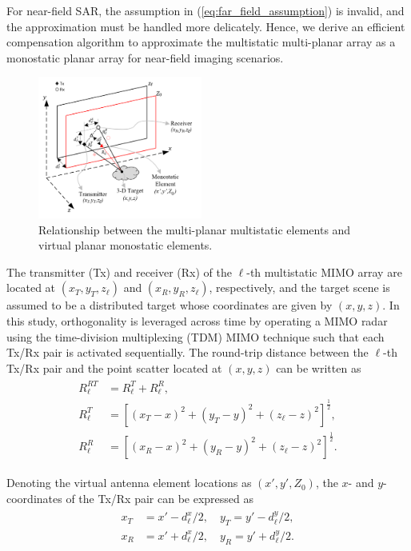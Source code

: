 \documentclass{ieeeaccess}
\begin{document}
For near-field SAR, the assumption in (\ref{eq:far_field_assumption}) is invalid, and the approximation must be handled more delicately. 
Hence, we derive an efficient compensation algorithm to approximate the multistatic multi-planar array as a monostatic planar array for near-field imaging scenarios.

\begin{figure}[h]
    \centering
    \includegraphics[width=0.48\textwidth]{smith2.png}
    \caption{Relationship between the multi-planar multistatic elements and virtual planar monostatic elements.}
    \label{fig:virtual_array_compensation}
\end{figure}

The transmitter (Tx) and receiver (Rx) of the $\ell$-th multistatic MIMO array are located at $(x_T,y_T,z_\ell)$ and $(x_R,y_R,z_\ell)$, respectively, and the target scene is assumed to be a distributed target whose coordinates are given by $(x,y,z)$. 
In this study, orthogonality is leveraged across time by operating a MIMO radar using the time-division multiplexing (TDM) MIMO technique such that each Tx/Rx pair is activated sequentially. 
The round-trip distance between the $\ell$-th Tx/Rx pair and the point scatter located at $(x,y,z)$ can be written as 
\begin{align}
\label{eq:Rl_of_xT_xR_yT_yR}
    \begin{split}
        R_\ell^{RT}&= R_\ell^T + R_\ell^R, \\
        R_\ell^T &= \left[(x_T - x)^2 + (y_T - y)^2 + (z_\ell - z)^2 \right]^{\frac{1}{2}}, \\
        R_\ell^R &= \left[(x_R - x)^2 + (y_R - y)^2 + (z_\ell - z)^2 \right]^{\frac{1}{2}}.
    \end{split}
\end{align}

Denoting the virtual antenna element locations as $(x',y',Z_0)$, the $x$- and $y$-coordinates of the Tx/Rx pair can be expressed as
\begin{align}
\label{eq:xT_xR_yT_yR_to_virtual}
    \begin{split}
        x_T &= x' - d_\ell^x/2, \quad y_T = y' - d_\ell^y/2, \\
        x_R &= x' + d_\ell^x/2, \quad y_R = y' + d_\ell^y/2.
    \end{split}
\end{align}
\end{document}
